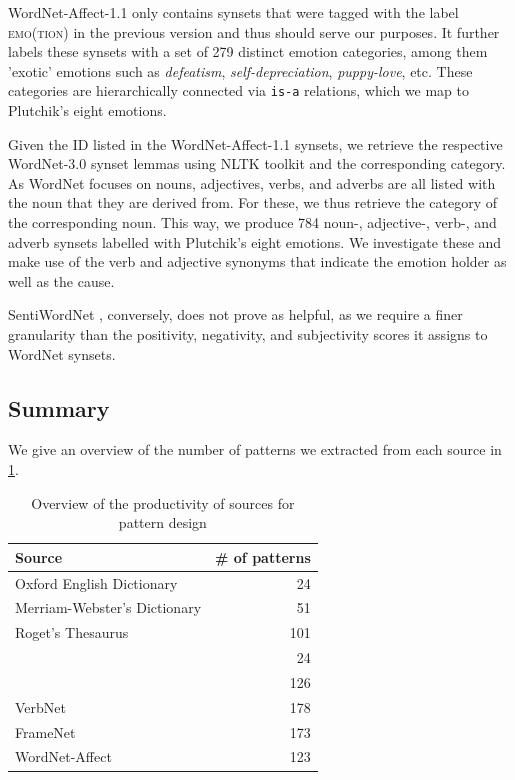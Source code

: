 WordNet-Affect-1.1 only contains synsets that were tagged with the label \textsc{emo(tion)} in the previous version and thus should serve our purposes. It further labels these synsets with a set of 279 distinct emotion categories, among them 'exotic' emotions such as \textit{defeatism}, \textit{self-depreciation}, \textit{puppy-love}, etc. These categories are hierarchically connected via \texttt{is-a} relations, which we map to Plutchik's eight emotions.

Given the ID listed in the WordNet-Affect-1.1 synsets, we retrieve the respective WordNet-3.0 synset lemmas using NLTK toolkit \cite{nltk} and the corresponding category. As WordNet focuses on nouns, adjectives, verbs, and adverbs are all listed with the noun that they are derived from. For these, we thus retrieve the category of the corresponding noun. This way, we produce 784 noun-, adjective-, verb-, and adverb synsets labelled with Plutchik's eight emotions. We investigate these and make use of the verb and adjective synonyms that indicate the emotion holder as well as the cause.

SentiWordNet \cite{sentiwordnet}, conversely, does not prove as helpful, as we require a finer granularity than the positivity, negativity, and subjectivity scores it assigns to WordNet synsets.

\subsection{Summary}

We give an overview of the number of patterns we extracted from each source in \ref{tab:patterns-from-sources}.

\begin{table}[]
\centering
\begin{tabular}{l|r}
{\bf Source}                 & {\bf \# of patterns} \\\hline
Oxford English Dictionary    & 24                   \\
Merriam-Webster's Dictionary & 51                   \\
Roget's Thesaurus            & 101                  \\
\citeauthor{emotion_verbs}   & 24                   \\
\citeauthor{adjective_supersenses} & 126                  \\
VerbNet                      & 178                  \\
FrameNet                     & 173                  \\
WordNet-Affect               & 123                 
\end{tabular}
\caption{Overview of the productivity of sources for pattern design}
\label{tab:patterns-from-sources}
\end{table}

